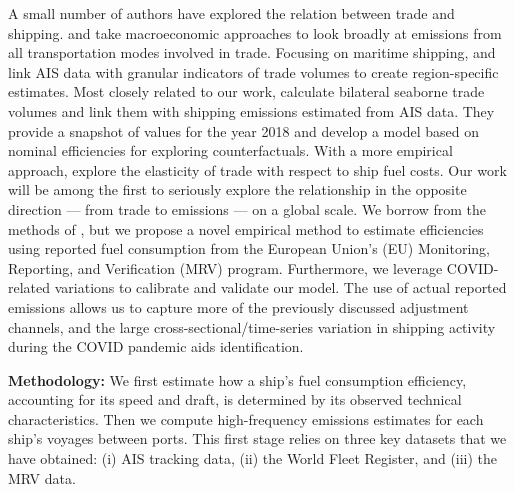 \documentclass[hidelinks, 12pt,letterpaper]{article}
\begin{document}
A small number of authors have explored the relation between trade and shipping. \citet{cristea2013trade} and \citet{shapiro2016trade} take macroeconomic approaches to look broadly at emissions from all transportation modes involved in trade. Focusing on maritime shipping, \citet{van2018spatially} and \citet{liu2019emissions} link AIS data with granular indicators of trade volumes to create region-specific estimates. Most closely related to our work, \citet{wang2021trade} calculate bilateral seaborne trade volumes and link them with shipping emissions estimated from AIS data. They provide a snapshot of values for the year 2018 and develop a model based on nominal efficiencies for exploring counterfactuals. With a more empirical approach, \citet{brancaccio2018impact} explore the elasticity of trade with respect to ship fuel costs. Our work will be among the first to seriously explore the relationship in the opposite direction --- from trade to emissions --- on a global scale. We borrow from the methods of \citet{wang2021trade}, but we propose a novel empirical method to estimate efficiencies using reported fuel consumption from the European Union's (EU) Monitoring, Reporting, and Verification (MRV) program. Furthermore, we leverage COVID-related variations to calibrate and validate our model. The use of actual reported emissions allows us to capture more of the previously discussed adjustment channels, and the large cross-sectional/time-series variation in shipping activity during the COVID pandemic aids identification. %

 \smallskip

\noindent \textbf{Methodology:}  We first estimate how a ship's fuel consumption efficiency, accounting for its speed and draft, is determined by its observed technical characteristics. Then we compute high-frequency emissions estimates for each ship's voyages between ports. This first stage relies on three key datasets that we have obtained: (i) AIS tracking data, (ii) the World Fleet Register, and (iii) the MRV data.
\end{document}
